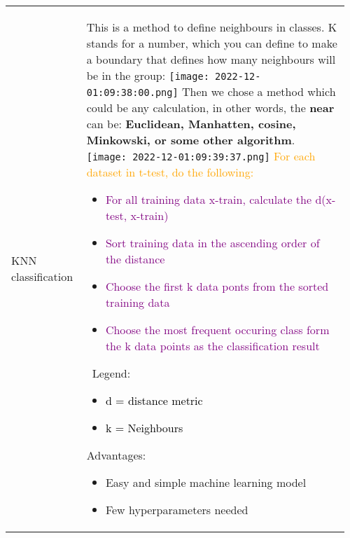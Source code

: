 \documentclass[main.tex,fontsize=8pt,paper=a4,paper=portrait,DIV=calc,]{scrartcl}
\begin{document}
\begin{table}[ht!]
\begin{tabular}{|m{0.2\linewidth}|m{0.755\linewidth}|}
\hline
KNN classification & 
This is a method to define neighbours in classes. \newline
K stands for a number, which you can define to make a boundary that defines how many neighbours will be in the group:\newline
\texttt{[image: 2022-12-01:09:38:00.png]}\newline
Then we chose a method which could be any calculation,\newline
in other words, the \textbf{near} can be: \textbf{Euclidean, Manhatten, cosine, Minkowski, or some other algorithm}.\newline
\texttt{[image: 2022-12-01:09:39:37.png]}\newline
\textcolor{orange}{For each dataset in t-test, do the following:}\newline
\begin{itemize}
\item \textcolor{purple}{For all training data x-train, calculate the d(x-test, x-train)}
\item \textcolor{purple}{Sort training data in the ascending order of the distance}
\item \textcolor{purple}{Choose the first k data ponts from the sorted training data}
\item \textcolor{purple}{Choose the most frequent occuring class form the k data points as the classification result}
\end{itemize} 
\, \newline
Legend:\newline
\begin{itemize}
\item \textcolor{black}{d = distance metric}
\item \textcolor{black}{k = Neighbours}
\end{itemize}
\minipg{
\textcolor{OliveGreen}{Advantages:}\newline
\begin{itemize}
\item \textcolor{OliveGreen}{Easy and simple machine learning model}
\item \textcolor{OliveGreen}{Few hyperparameters needed}
  \vspace{2mm}
  \vspace{2mm}
  \vspace{2mm}
\end{itemize}
}
\end{tabular}
\end{table}
\end{document}
